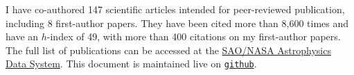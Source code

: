 I have co-authored 147 scientific articles intended for peer-reviewed 
publication, including 8 first-author papers. They have been cited more than 
8,600 times and have an $h$-index of 49, with more than 400 citations on my 
first-author papers. The full list of publications can be accessed at the 
\href{https://goo.gl/LAu9G4}{SAO/NASA Astrophysics Data System}.
%
This document is maintained live on
\href{https://github.com/cristobal-sifon/cv/blob/master/Sifon_publications.pdf}{\texttt{github}}.

